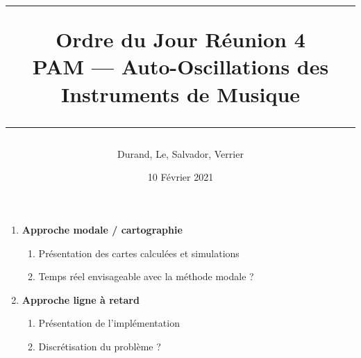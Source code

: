\documentclass[a4paper, 11pt]{article}
\title{
	\noindent\rule{\linewidth}{0.4pt}
	\huge{Ordre du Jour Réunion 4\\}
	\medskip
	\Large{PAM --- Auto-Oscillations des Instruments de Musique}
	\noindent\rule{\linewidth}{1pt}
}
\author{Durand, Le, Salvador, Verrier}
\date{10 Février 2021}
\begin{document}
\maketitle


\begin{enumerate}
	\item \textbf{Approche modale / cartographie}
	\begin{enumerate}
		\item Présentation des cartes calculées et simulations
		\item Temps réel envisageable avec la méthode modale ?
	\end{enumerate}
	
	\item \textbf{Approche ligne à retard}
	\begin{enumerate}
		\item Présentation de l'implémentation
		\item Discrétisation du problème ?
	\end{enumerate}
	
\end{enumerate}
\end{document}
